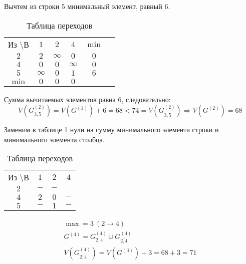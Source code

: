 Вычтем из строки $5$ минимальный элемент, равный $6$.

\begin{table}[H]
\begin{center}
	\def\tabcolsep{15pt}
	\caption{Таблица переходов}
	\label{tab:16}
	\begin{tabular}{|c||c|c|c|c|c|}
		\hline
		Из \textbackslash В & $1$ & $2$ & $4$ & $\min$ \\
		\hhline{|=#=|=|=|=|}
		$2$ & $2$ & $\infty$ & $0$ & $0$ \\
		\hline
		$4$ & $0$ & $0$ & $\infty$ & $0$ \\
		\hline
		$5$ & $\infty$ & $0$ & $1$ & $6$ \\
		\hhline{|=#=|=|=|=|} 
		$\min$ & $0$ & $0$ & $0$ & \\ 
		\hline
	\end{tabular}
\end{center}
\end{table}

Сумма вычитаемых элементов равна $6$, следовательно:
\begin{equation*}
V(G_{3,5}^{(2)}) = V(G^{(1)}) + 6 = 68 < 74 = V(G_{\overline{3,5}}^{(2)}) \Rightarrow V(G^{(2)}) = 68
\end{equation*}

Заменим в таблице \ref{tab:16} нули на сумму минимального элемента строки и минимального элемента столбца.

\begin{table}[H]
\begin{center}
	\def\tabcolsep{15pt}
	\caption{Таблица переходов}
	\label{tab:17}
	\begin{tabular}{|c||c|c|c|}
		\hline
		Из \textbackslash В & $1$ & $2$ & $4$ \\
		\hhline{|=#=|=|=|}
		$2$ & $-$ & $-$ & \redbold{$3$} \\
		\hline
		$4$ & $2$ & $0$ & $-$ \\
		\hline
		$5$ & $-$ & $1$ & $-$ \\
		\hline
	\end{tabular}
\end{center}
\end{table}

\begin{gather*}
\max = 3\ (2 \rightarrow 4) \\
G^{(4)} = G_{2,4}^{(4)} \cup G_{\overline{2,4}}^{(4)} \\
V(G_{\overline{2,4}}^{(4)}) = V(G^{(3)}) + 3 = 68 + 3 = 71
\end{gather*}

